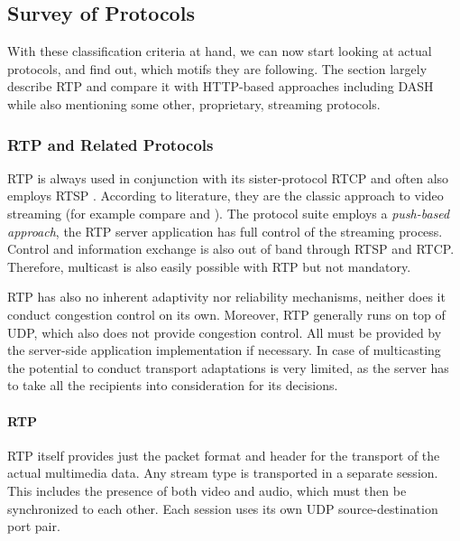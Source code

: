 \subsection{Survey of Protocols}

With these classification criteria at hand, we can now start looking at actual protocols, and find out, which motifs they are following. The section largely describe \gls{RTP} and compare it with \gls{HTTP}-based approaches including \gls{DASH} while also mentioning some other, proprietary, streaming protocols.


\subsubsection{RTP and Related Protocols}

\gls{RTP} \cite{rfc3550} is always used in conjunction with its sister-protocol \gls{RTCP} and often also employs \gls{RTSP} \cite{rfc2326}. According to literature, they are the classic approach to video streaming (for example compare \cite[p.~589ff]{kurose2008computer} and \cite[p.~426ff]{peterson2007computer}).
The protocol suite employs a \textit{push-based approach}, the \gls{RTP} server application has full control of the streaming process. Control and information exchange is also out of band through \gls{RTSP} and \gls{RTCP}. Therefore, multicast is also easily possible with \gls{RTP} but not mandatory.

\gls{RTP} has also no inherent adaptivity nor reliability mechanisms, neither does it conduct congestion control on its own. Moreover, \gls{RTP} generally runs on top of \gls{UDP}, which also does not provide congestion control. All must be provided by the server-side application implementation if necessary. In case of multicasting the potential to conduct transport adaptations is very limited, as the server has to take all the recipients into consideration for its decisions.


\paragraph{RTP}

\gls{RTP} itself provides just the packet format and header for the transport of the actual multimedia data. Any stream type is transported in a separate session. This includes the presence of both video and audio, which must then be synchronized to each other. Each session uses its own \gls{UDP} source-destination port pair.

